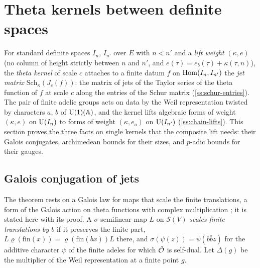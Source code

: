 \section{Theta kernels between definite spaces}\label{sec:kernels}

For standard definite spaces $I_n$, $I_{n'}$ over $E$ with $n<n'$ and a \emph{lift weight} $(\kappa,e)$ (no
column of height strictly between $n$ and $n'$, and $e(\tau)=e_b(\tau)+\kappa(\tau,n)$), the \emph{theta kernel}
of scale $c$ attaches to a finite datum $f$ on $\operatorname{Hom}(I_n,I_{n'})$ the \emph{jet matrix}
$\mathrm{Sch}_\kappa(J_c(f))$: the matrix of jets of the Taylor series of the theta function of $f$ at scale $c$
along the entries of the Schur matrix (\cref{ss:schur-entries}). The pair of finite adelic groups acts on data by the
Weil representation twisted by characters $a$, $b$ of $\operatorname{U}(1)(\mathbb{A})$, and the kernel lifts algebraic forms of weight
$(\kappa,e)$ on $\operatorname{U}(I_n)$ to forms of weight $(\kappa,e_a)$ on $\operatorname{U}(I_{n'})$ (\cref{ss:chain-lifts}). This section
proves the three facts on single kernels that the composite lift needs: their Galois conjugates, archimedean bounds
for their sizes, and $p$-adic bounds for their gauges.

\subsection{Galois conjugation of jets}\label{ss:jet-conjugation}

The theorem rests on a Galois law for maps that scale the finite translations, a form of the Galois action on theta functions with complex multiplication \cite{Shimura1976}; it is stated here with its proof. A $\sigma$-semilinear map $L$ on $\mathcal S(V)$ \emph{scales finite translations by $b$} if it preserves the finite part, $L\varrho(\mathrm{fin}(x))=\varrho(\mathrm{fin}(bx))L$ there, and $\sigma(\psi(z))=\psi(b\bar bz)$ for the additive character
$\psi$ of the finite adeles for which $\hat{\mathcal{O}}$ is self-dual. Let $\Delta(g)$ be the multiplier of the Weil representation at a finite point $g$.

